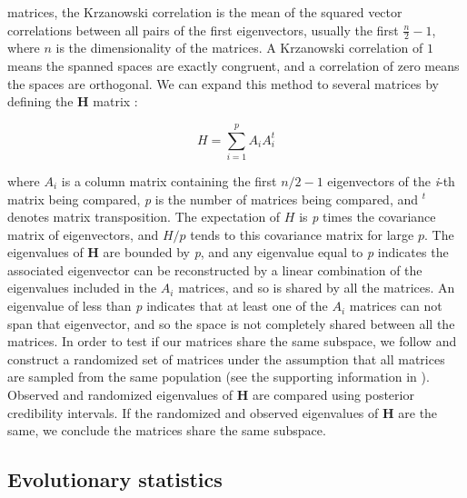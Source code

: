 \begin{refsection}
matrices, the Krzanowski correlation is the mean of the squared vector
correlations between all pairs of the first eigenvectors, usually the
first \(\frac{n}{2} - 1\), where \(n\) is the dimensionality of the matrices. A
Krzanowski correlation of \(1\) means the spanned spaces are exactly
congruent, and a correlation of zero means the spaces are orthogonal. We
can expand this method to several matrices by defining the \textbf{H}
matrix \parencite{Krzanowski1979-gj}:

\[
H = \sum_{i=1}^p A_iA_i^t
\]

where \(A_i\) is a column matrix containing the first \(n/2 - 1\)
eigenvectors of the \emph{i}-th matrix being compared, \emph{p} is the
number of matrices being compared, and \(^t\) denotes matrix
transposition. The expectation of \(H\) is \emph{p} times the covariance
matrix of eigenvectors, and \(H/p\) tends to this covariance matrix for
large \(p\). The eigenvalues of \textbf{H} are bounded by \emph{p}, and
any eigenvalue equal to \emph{p} indicates the associated eigenvector
can be reconstructed by a linear combination of the eigenvalues included
in the \(A_i\) matrices, and so is shared by all the matrices. An
eigenvalue of less than \emph{p} indicates that at least one of the
\(A_i\) matrices can not span that eigenvector, and so the space is not
completely shared between all the matrices. In order to test if our
matrices share the same subspace, we follow \textcite{Aguirre2013-lp} and construct a
randomized set of matrices under the assumption that all matrices are
sampled from the same population (see the supporting information in
\textcite{Aguirre2013-lp}). Observed and randomized eigenvalues of \textbf{H} are
compared using posterior credibility intervals. If the randomized and
observed eigenvalues of \textbf{H} are the same, we conclude the
matrices share the same subspace.

\subsection{Evolutionary statistics}


\end{refsection}
